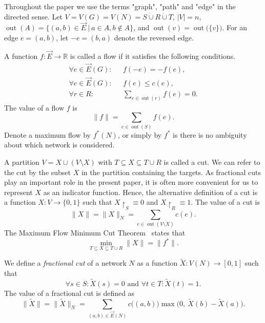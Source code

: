 \documentclass[12pt,a4paper]{article}
\newcommand{\out}{\operatorname{out}}
\newcommand{\vE}{\vec{E}}
\newcommand{\EG}{\vec{E}(G)}
\renewcommand{\:}{\colon}
\begin{document}
Throughout the paper we use the terms "graph", "path" and "edge" in the directed sense. 
Let $V = V(G) = V(N) = S \dot\cup R \dot\cup T$, $|V| = n$, $\out(A) = \big\{(a, b) \in \vE \ \big|\ a \in A, b \notin A \big\}$, and $\out(v) = \out\big(\{v\}\big)$. 
For an edge $e = (a, b)$, let $-e = (b, a)$ denote the reversed edge.

A function $f\: \vE \rightarrow \mathbb{R}$ is called a flow if it satisfies the following conditions.
\begin{align}
\forall e \in \EG\:&\,\,\,\, f(-e) = -f(e), \label{antisymmetry}
\\ \forall e \in \EG\:&\,\,\,\, f(e) \le c(e), \label{capacity}
\\ \forall r \in R\:&\,\,\,\, \sum_{e \in \out(r)} f(e) = 0. \label{regeq}
\end{align}
The value of a flow $f$ is
\begin{equation} \label{flownorm}
\big\|f\big\| = \sum_{e \in \out(S)} f(e).
\end{equation}
Denote a maximum flow by $f^*(N)$, or simply by $f^*$ is there is no ambiguity about which network is considered.

A partition $V=X\cup(V\setminus X)$ with $T \subseteq X \subseteq T \cup R$ is called a cut. 
We can refer to the cut by the subset $X$ in the partition containing the targets. 
As fractional cuts play an important role in the present paper, it is often more convenient for us to represent $X$ as an indicator function. 
Hence, the alternative definition of a cut is a function $X: V\rightarrow \{0,1\}$ such that $X\upharpoonright_S \equiv 0$ and $X\upharpoonright_R \equiv 1$.
The value of a cut is
\begin{equation} \label{cutnorm}
\big\|X\big\| = \big\|X\big\|_N = \sum\limits_{e \in \out(V\setminus X)} c(e).
\end{equation}
The Maximum Flow Minimum Cut Theorem~\cite{FoFu} states that
\begin{equation} \label{maxflowmincut}
\min\limits_{T \subseteq X \subseteq T \cup R} \big\|X\big\| = \big\|f^*\big\|.
\end{equation}

We define a \emph{fractional cut} of a network $N$ as a function $\tilde{X}\: V(N) \rightarrow [0, 1]$ such that
\begin{equation} \label{fraccut}
\forall s \in S\: \tilde{X}(s) = 0 \text{ and } \forall t \in T\: \tilde{X}(t) = 1.
\end{equation}
The value of a fractional cut is defined as
\begin{equation} \label{fracnorm}
\big\|\tilde{X}\big\| = \big\|\tilde{X}\big\|_N = \sum_{(a, b) \in \vE(N)} c\big((a, b)\big) \max\big(0,\ \tilde{X}(b) - \tilde{X}(a)\big).
\end{equation}
\end{document}
